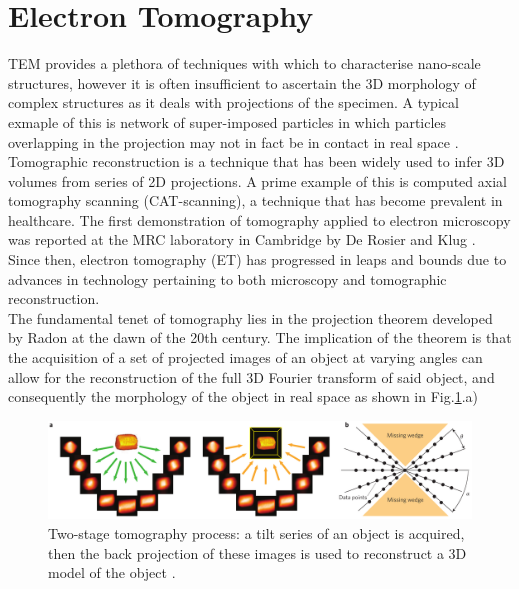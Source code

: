 \section{Electron Tomography}
TEM provides a plethora of techniques with which to characterise nano-scale structures, however it is often insufficient to ascertain the 3D morphology of complex structures as it deals with projections of the specimen. A typical exmaple of this is  network of super-imposed particles in which particles overlapping in the projection may not in fact be in contact in real space \cite{Divitni2012}.\\
Tomographic reconstruction is a technique that has been widely used to infer 3D volumes from series of 2D projections. A prime example of this is computed axial tomography scanning (CAT-scanning), a technique that has become prevalent in healthcare. The first demonstration of tomography applied to electron microscopy was reported at the MRC laboratory in Cambridge by De Rosier and Klug \cite{DeRosier1968}. Since then, electron tomography (ET) has progressed in leaps and bounds due to advances in technology pertaining to both microscopy and tomographic reconstruction.\\
The fundamental tenet of tomography lies in the projection theorem developed by Radon at the dawn of the 20th century. The implication of the theorem is that the acquisition of a set of projected images of an object at varying angles can allow for the reconstruction of the full 3D Fourier transform of said object, and consequently the morphology of the object in real space \cite{Divitni2012} as shown in Fig.\ref{Midgley}.a)\\
\begin{figure}[!ht]
	\centering
	\includegraphics[width=1\textwidth]{Figs/Ch2/tomo}
	\caption[h] {Two-stage tomography process: a tilt series of an object is acquired, then the back projection of these images is used to reconstruct a 3D model of the object \cite{Midgley2009}.}
	\label{Midgley}
\end{figure}
\FloatBarrier

